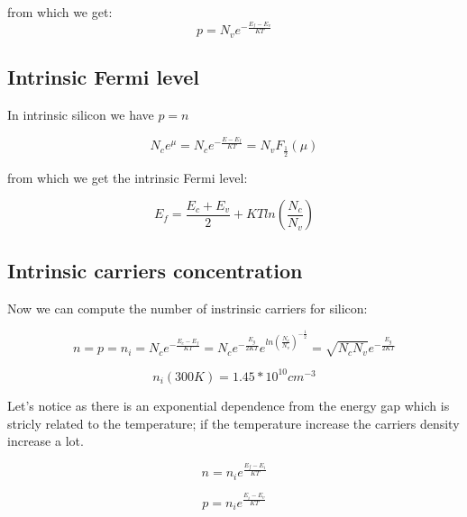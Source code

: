 			from which we get:
			\begin{equation}
				p=N_ve^{-\frac{E_f-E_v}{KT}}
			\end{equation}

		\subsection{Intrinsic Fermi level} %
			\label{sub:intrinsic_Fermi_level}
			 In intrinsic silicon we have $p=n$

			 \[N_ce^ {\mu}= N_ce^ {-\frac{E-E_f}{KT}}=N_vF_{\frac {1} {2} }( \mu)\]

			 from which we get the intrinsic Fermi level:
			
			\begin{equation}
				\label{eq:Fermi}
				E_f = \frac {E_c+E_v}{2}+KTln(\frac{N_c}{N_v})
			\end{equation}


		\subsection{Intrinsic carriers concentration} %
			\label{sub:intrinsic_carriers_concentration}

			Now we can compute the number of instrinsic carriers for silicon:

			\begin{equation}
				n=p=n_i=N_ce^{-\frac{E_c-E_f}{KT}}=N_ce^{-\frac{E_g}{2KT}}e^{ln(\frac{N_c}{N_v})^{-\frac{1}{2}}}=\sqrt{N_cN_v}e^{-\frac{E_g}{2KT}}
			\end{equation}

			\[n_i( 300K )=1.45 * 10^{10} cm^{-3}\]

			Let's notice as there is an exponential dependence from the energy gap which is stricly related to the temperature; if the temperature increase the carriers density increase a lot.

			\begin{equation}
				n=n_ie^{\frac{E_f-E_i}{KT}}
			\end{equation}

			\begin{equation}
				p=n_ie^{\frac{E_i-E_v}{KT}}
			\end{equation}
			 
